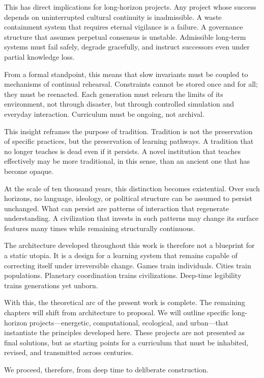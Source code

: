 \documentclass[12pt,oneside]{book}
\begin{document}
This has direct implications for long-horizon projects. Any project whose success depends on uninterrupted cultural continuity is inadmissible. A waste containment system that requires eternal vigilance is a failure. A governance structure that assumes perpetual consensus is unstable. Admissible long-term systems must fail safely, degrade gracefully, and instruct successors even under partial knowledge loss.

From a formal standpoint, this means that slow invariants must be coupled to mechanisms of continual rehearsal. Constraints cannot be stored once and for all; they must be reenacted. Each generation must relearn the limits of its environment, not through disaster, but through controlled simulation and everyday interaction. Curriculum must be ongoing, not archival.

This insight reframes the purpose of tradition. Tradition is not the preservation of specific practices, but the preservation of learning pathways. A tradition that no longer teaches is dead even if it persists. A novel institution that teaches effectively may be more traditional, in this sense, than an ancient one that has become opaque.

At the scale of ten thousand years, this distinction becomes existential. Over such horizons, no language, ideology, or political structure can be assumed to persist unchanged. What can persist are patterns of interaction that regenerate understanding. A civilization that invests in such patterns may change its surface features many times while remaining structurally continuous.

The architecture developed throughout this work is therefore not a blueprint for a static utopia. It is a design for a learning system that remains capable of correcting itself under irreversible change. Games train individuals. Cities train populations. Planetary coordination trains civilizations. Deep-time legibility trains generations yet unborn.

With this, the theoretical arc of the present work is complete. The remaining chapters will shift from architecture to proposal. We will outline specific long-horizon projects—energetic, computational, ecological, and urban—that instantiate the principles developed here. These projects are not presented as final solutions, but as starting points for a curriculum that must be inhabited, revised, and transmitted across centuries.

We proceed, therefore, from deep time to deliberate construction.
\end{document}
